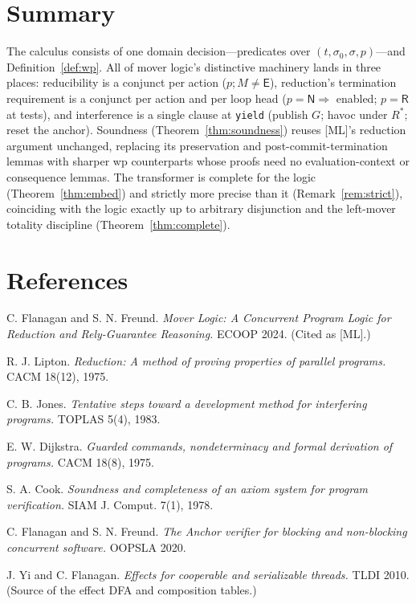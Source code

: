 \documentclass[11pt]{article}
\theoremstyle{plain}
\theoremstyle{plain}
\theoremstyle{definition}
\newcommand{\MR}{\mathsf{R}}
\newcommand{\MN}{\mathsf{N}}
\newcommand{\ME}{\mathsf{E}}
\newcommand{\code}[1]{\texttt{#1}}
\begin{document}
\section{Summary}\label{sec:summary}

The calculus consists of one domain decision---predicates over
$(t,\sigma_0,\sigma,p)$---and Definition~\ref{def:wp}. All of mover logic's
distinctive machinery lands in three places: reducibility is a conjunct per action
($p;M\neq\ME$), reduction's termination requirement is a conjunct per action and
per loop head ($p=\MN\Rightarrow$ enabled; $p=\MR$ at tests), and interference is a
single clause at \code{yield} (publish $G$; havoc under $R^*$; reset the anchor).
Soundness (Theorem~\ref{thm:soundness}) reuses [ML]'s reduction argument unchanged,
replacing its preservation and post-commit-termination lemmas with sharper wp
counterparts whose proofs need no evaluation-context or consequence lemmas. The
transformer is complete for the logic (Theorem~\ref{thm:embed}) and strictly more
precise than it (Remark~\ref{rem:strict}), coinciding with the logic exactly up to
arbitrary disjunction and the left-mover totality discipline
(Theorem~\ref{thm:complete}).

\section*{References}
\begin{enumerate}[leftmargin=1.6em,label={[\arabic*]}]
\item C. Flanagan and S. N. Freund. \emph{Mover Logic: A Concurrent Program Logic
  for Reduction and Rely-Guarantee Reasoning.} ECOOP 2024. (Cited as [ML].)
\item R. J. Lipton. \emph{Reduction: A method of proving properties of parallel
  programs.} CACM 18(12), 1975.
\item C. B. Jones. \emph{Tentative steps toward a development method for
  interfering programs.} TOPLAS 5(4), 1983.
\item E. W. Dijkstra. \emph{Guarded commands, nondeterminacy and formal derivation
  of programs.} CACM 18(8), 1975.
\item S. A. Cook. \emph{Soundness and completeness of an axiom system for program
  verification.} SIAM J. Comput. 7(1), 1978.
\item C. Flanagan and S. N. Freund. \emph{The Anchor verifier for blocking and
  non-blocking concurrent software.} OOPSLA 2020.
\item J. Yi and C. Flanagan. \emph{Effects for cooperable and serializable
  threads.} TLDI 2010. (Source of the effect DFA and composition tables.)
\end{enumerate}
\end{document}
